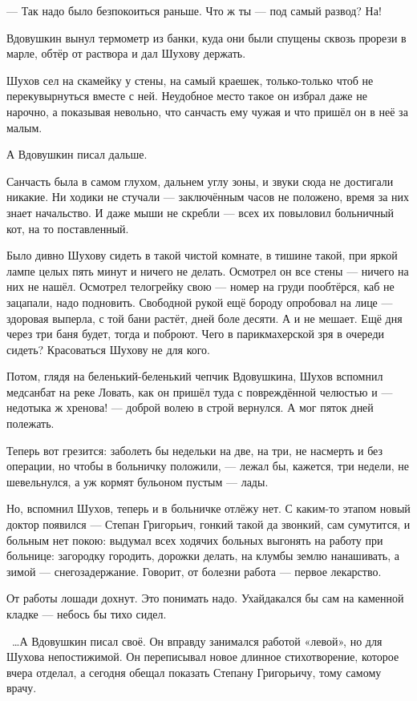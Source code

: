 --- Так надо было безпокоиться раньше. Что ж ты --- под самый развод? На!

Вдовушкин вынул термометр из банки, куда они были спущены сквозь прорези в марле, обтёр от 
раствора и дал Шухову держать.

Шухов сел на скамейку у стены, на самый краешек, только-только чтоб не перекувырнуться 
вместе с ней. Неудобное место такое он избрал даже не нарочно, а показывая невольно, что 
санчасть ему чужая и что пришёл он в неё за малым.

А Вдовушкин писал дальше.

Санчасть была в самом глухом, дальнем углу зоны, и звуки сюда не достигали никакие. Ни ходики 
не стучали --- заключённым часов не положено, время за них знает начальство. И даже мыши не 
скребли --- всех их повыловил больничный кот, на то поставленный.

Было дивно Шухову сидеть в такой чистой комнате, в тишине такой, при яркой лампе целых пять 
минут и ничего не делать. Осмотрел он все стены --- ничего на них не нашёл. Осмотрел телогрейку 
свою --- номер на груди пообтёрся, каб не зацапали, надо подновить. Свободной рукой ещё бороду 
опробовал на лице --- здоровая выперла, с той бани растёт, дней боле десяти. А и не мешает. Ещё 
дня через три баня будет, тогда и поброют. Чего в парикмахерской зря в очереди сидеть? 
Красоваться Шухову не для кого.

Потом, глядя на беленький-беленький чепчик Вдовушкина, Шухов вспомнил медсанбат на реке 
Ловать, как он пришёл туда с повреждённой челюстью и --- недотыка ж хренова! --- доброй волею в 
строй вернулся. А мог пяток дней полежать.

Теперь вот грезится: заболеть бы недельки на две, на три, не насмерть и без операции, но чтобы 
в больничку положили, --- лежал бы, кажется, три недели, не шевельнулся, а уж кормят бульоном 
пустым --- лады.

Но, вспомнил Шухов, теперь и в больничке отлёжу нет. С каким-то этапом новый доктор появился 
--- Степан Григорьич, гонкий такой да звонкий, сам сумутится, и больным нет покою: выдумал всех 
ходячих больных выгонять на работу при больнице: загородку городить, дорожки делать, на 
клумбы землю нанашивать, а зимой --- снегозадержание. Говорит, от болезни работа --- первое 
лекарство.

От работы лошади дохнут. Это понимать надо. Ухайдакался бы сам на каменной кладке --- небось 
бы тихо сидел.

~\dots{}А Вдовушкин писал своё. Он вправду занимался работой «левой», но для Шухова 
непостижимой. Он переписывал новое длинное стихотворение, которое вчера отделал, а сегодня 
обещал показать Степану Григорьичу, тому самому врачу.

